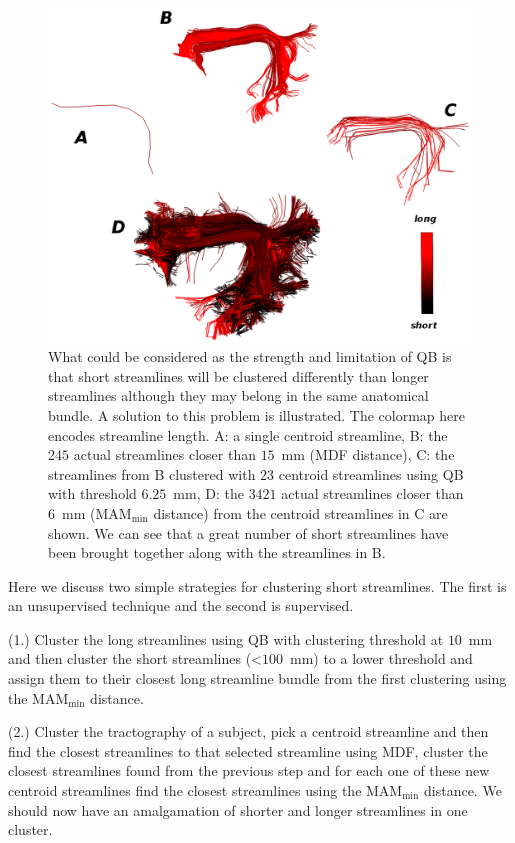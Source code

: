 \documentclass{bioinfo}
\begin{document}
\begin{figure}
  \centerline{\hspace{-1.5mm}\includegraphics[scale=0.65]{Figures/Fig_10_arcuate_small_fibers}}
  \caption{What could be considered as the strength and limitation of QB
    is that short streamlines will be clustered differently than longer
    streamlines although they may belong in the same anatomical
    bundle. A solution to this problem is illustrated. The colormap here
    encodes streamline length. A: a single centroid streamline, B: the
    $245$ actual streamlines closer than $15$~mm (MDF distance), C: the
    streamlines from B clustered with $23$ centroid streamlines using QB
    with threshold $6.25$~mm, D: the $\num{3421}$ actual streamlines
    closer than $6$~mm ($\textrm{MAM}_{\textrm{min}}$ distance) from the
    centroid streamlines in C are shown. We can see that a great number
    of short streamlines have been brought together along with the
    streamlines in B. \label{Flo:arcuate_close}}
\end{figure}

Here we discuss two simple strategies for clustering short
streamlines. The first is an unsupervised technique and the second is
supervised.

(1.) Cluster the long streamlines using QB with clustering threshold at
$10$~mm and then cluster the short streamlines (<$100$~mm) to a lower
threshold and assign them to their closest long streamline bundle from
the first clustering using the $\mathrm{MAM}_{\mathrm{min}}$ distance.

(2.) Cluster the tractography of a subject, pick a centroid
streamline and then find the closest streamlines to that selected
streamline using MDF, cluster the closest streamlines found from the
previous step and for each one of these new centroid streamlines find
the closest streamlines using the $\textrm{MAM}_{\textrm{min}}$
distance. We should now have an amalgamation of shorter and longer
streamlines in one cluster.
\end{document}
